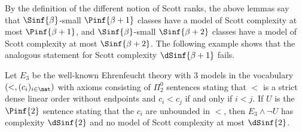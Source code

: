 \documentclass{amsart}
\renewcommand{\-}{\text{-}}
\begin{document}
By the definition of the different notion of Scott ranks, the above lemmas say that $\Sinf{\beta}$-small $\Pinf{\beta+1}$ classes have a model of Scott complexity at most $\Pinf{\beta+1}$, and $\Sinf{\beta}$-small $\Sinf{\beta+2}$ classes have a model of Scott complexity at most $\Sinf{\beta+2}$.
The following example shows that the analogous statement for Scott complexity $\dSinf{\beta+1}$ fails.
\begin{example}\label{ex:cutModels}
  Let $E_3$ be the well-known Ehrenfeucht theory with 3 models in the vocabulary $(<, (c_i)_{i\in\nat})$ with axioms consisting of $\Pi^0_2$ sentences stating that $<$ is a strict dense linear order without endpoints and $c_i< c_j$ if and only if $i<j$. If $U$ is the $\Pinf{2}$ sentence stating that the $c_i$ are unbounded in $<$, then $E_3\land \neg U$ has complexity $\dSinf{2}$ and no model of Scott complexity at most $\dSinf{2}$.
\end{example}
\end{document}
